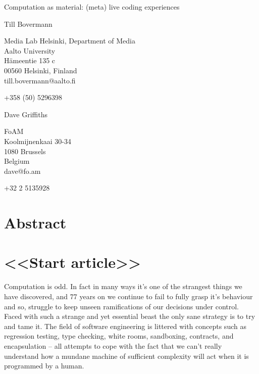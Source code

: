 \documentclass[letterpaper, 12pt]{article}
\begin{document}
{\cmjTitle 	Computation as material: (meta) live coding experiences}
\vspace*{24pt}


{\cmjAuthor Till Bovermann}
\newline
\begin{cmjAuthorAddress}
	Media Lab Helsinki, Department of Media\\
	Aalto University\\
	H\"ameentie 135 c\\
	00560 Helsinki, Finland\\
	till.bovermann@aalto.fi
\end{cmjAuthorAddress}

\vspace*{24pt}
{\cmjAuthorPhone +358 (50) 5296398}
\vspace*{24pt}

{\cmjAuthor Dave Griffiths}
\newline
\begin{cmjAuthorAddress}
	FoAM\\
	Koolmijnenkaai 30-34\\
	1080 Brussels\\
	Belgium\\
	dave@fo.am
\end{cmjAuthorAddress}

\vspace*{24pt}
{\cmjAuthorPhone +32 2 5135928}
\vspace*{24pt}


\section{Abstract}



\section{<<Start article>>}


Computation is odd. 
In fact in many ways it's one of the strangest things we have discovered, and 77 years on we continue to fail to fully grasp it's behaviour and so, struggle to keep unseen ramifications of our decisions under control. Faced with such a strange and yet essential beast the only sane strategy is to try and tame it. 
The field of software engineering is littered with concepts such as regression testing, type checking, white rooms, sandboxing, contracts, and encapsulation -- all attempts to cope with the fact that we can't really understand how a mundane machine of sufficient complexity will act when it is programmed by a human.
\end{document}
